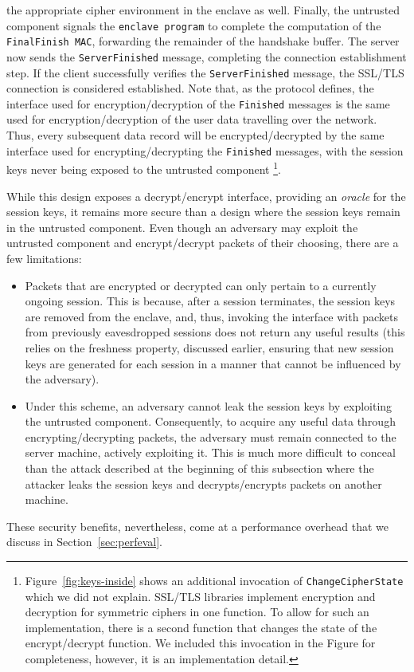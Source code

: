 \documentclass[../../main.tex]{subfiles}
\begin{document}
the appropriate cipher environment in the enclave as well. Finally,
the untrusted component signals the \texttt{enclave program} to
complete the computation of the \texttt{FinalFinish MAC}, forwarding
the remainder of the handshake buffer. The server now sends the
\texttt{ServerFinished} message, completing the connection
establishment step. If the client successfully verifies the
\texttt{ServerFinished} message, the SSL/TLS connection is considered
established. Note that, as the protocol defines, the interface used
for encryption/decryption of the \texttt{Finished} messages is the
same used for encryption/decryption of the user data travelling over
the network. Thus, every subsequent data record will be
encrypted/decrypted by the same interface used for
encrypting/decrypting the \texttt{Finished} messages, with the session
keys never being exposed to the untrusted component
\footnote{Figure~\ref{fig:keys-inside} shows an additional invocation
  of \texttt{Change\-Cipher\-State} which we did not explain. SSL/TLS
  libraries implement encryption and decryption for symmetric ciphers
  in one function. To allow for such an implementation, there is a
  second function that changes the state of the encrypt/decrypt
  function. We included this invocation in the Figure for
  completeness, however, it is an implementation detail.}.

While this design exposes a decrypt/encrypt interface, providing an
\textit{oracle} for the session keys, it remains more secure than a
design where the session keys remain in the untrusted component. Even
though an adversary may exploit the untrusted component and
encrypt/decrypt packets of their choosing, there are a few
limitations:
\begin{itemize}
  \item Packets that are encrypted or decrypted can only pertain to
    a currently ongoing session. This is because, after a session
    terminates, the session keys are removed from the enclave, and, thus,
    invoking the interface with packets from previously eavesdropped
    sessions does not return any useful results (this relies on the
    freshness property, discussed earlier, ensuring that new session keys
    are generated for each session in a manner that cannot be influenced
    by the adversary).
  \item Under this scheme, an adversary cannot leak the session keys
    by exploiting the untrusted component. Consequently, to acquire
    any useful data through encrypting/decrypting packets, the adversary
    must remain connected to the server machine, actively exploiting it.
    This is much more difficult to conceal than the attack described
    at the beginning of this subsection where the attacker leaks the session
    keys and decrypts/encrypts packets on another machine.
\end{itemize}
These security benefits, nevertheless, come at a performance overhead
that we discuss in Section~\ref{sec:perfeval}.
\end{document}
